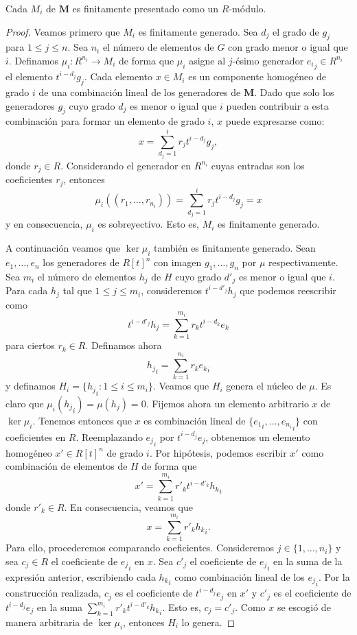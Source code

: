 \begin{lema}
	\label{lem:finit-pres} Cada $M_{i}$ de $\mathbf{M}$ es finitamente presentado como
	un $R$-módulo.
\end{lema}
\begin{proof}
	Veamos primero que $M_{i}$ es finitamente generado. Sea $d_{j}$ el grado de
	$g_{j}$ para $1 \leq j \leq n$. Sea $n_{i}$ el número de elementos de $G$ con grado
	menor o igual que $i$. Definamos $\mu_{i} : R^{n_i}\to M_{i}$ de forma que
	$\mu_{i}$ asigne al $j$-ésimo generador ${e_i}_{j} \in R^{n_i}$ el elemento
	$t^{i-d_j}g_{j}$. Cada elemento $x \in M_{i}$ es un componente homogéneo de grado
	$i$ de una combinación lineal de los generadores de $\mathbf{M}$. Dado que
	solo los generadores $g_{j}$ cuyo grado $d_{j}$ es menor o igual que $i$
	pueden contribuir a esta combinación para formar un elemento de grado $i$, $x$
	puede expresarse como:
	\[
	x = \sum_{d_j = 1}^{i} r_{j} t^{i-d_j}g_{j},
	\]
	donde $r_{j} \in R$. Considerando el generador en $R^{n_i}$ cuyas entradas son
	los coeficientes $r_{j}$, entonces
	\[
	\mu_{i}((r_{1}, \ldots, r_{n_i})) = \sum_{d_j = 1}^{i} r_{j} t^{i-d_j}g_{j} =
	x
	\]
	y en consecuencia, $\mu_{i}$ es sobreyectivo. Esto es, $M_{i}$ es finitamente generado.
	
	A continuación veamos que $\ker \mu_{i}$ también es finitamente generado. Sean
	$e_{1}, \ldots, e_{n}$ los generadores de $R[t]^{n}$ con imagen
	$g_{1}, \ldots, g_{n}$ por $\mu$ respectivamente. Sea $m_{i}$ el número de elementos
	$h_{j}$ de $H$ cuyo grado $d'_{j}$ es menor o igual que $i$. Para cada $h_{j}$
	tal que $1 \leq j \leq m_{i}$, consideremos $t^{i-d'_j}h_{j}$ que podemos reescribir
	como
	\[
	t^{i-d'_j}h_{j} = \sum_{k=1}^{m_i}r_{k} t^{i-d_k}e_{k}
	\]
	para ciertos $r_{k} \in R$. Definamos ahora
	\[
	{h_j}_{i} = \sum_{k=1}^{n_i}r_{k}{e_k}_{i}
	\]
	y definamos $H_{i} = \{{h_j}_{i} : 1 \leq i \leq m_{i} \}$. Veamos que $H_{i}$
	genera el núcleo de $\mu$. Es claro que $\mu_{i}({h_j}_{i}) = \mu(h_{j}) = 0$.
	Fijemos ahora un elemento arbitrario $x$ de $\ker \mu_{i}$. Tenemos entonces
	que $x$ es combinación lineal de $\{{e_1}_{i}, \ldots,{e_{n_i}}_{i}\}$ con
	coeficientes en $R$. Reemplazando ${e_j}_{i}$ por $t^{i-d_j}e_{j}$, obtenemos
	un elemento homogéneo $x' \in R[t]^{n}$ de grado $i$. Por hipótesis, podemos
	escribir $x'$ como combinación de elementos de $H$ de forma que
	\[
	x' = \sum_{k=1}^{m_i}r'_{k} t^{i-d'_k}{h_k}_{i}
	\]
	donde $r'_{k} \in R$. En consecuencia, veamos que
	\[
	x = \sum_{k=1}^{m_i}r'_{k}{h_k}_{i}.
	\]
	Para ello, procederemos comparando coeficientes. Consideremos
	$j \in \{1, \ldots, n_{i}\}$ y sea $c_{j} \in R$ el coeficiente de ${e_j}_{i}$
	en $x$. Sea $c'_{j}$ el coeficiente de ${e_j}_{i}$ en la suma de la expresión anterior,
	escribiendo cada ${h_k}_{i}$ como combinación lineal de los ${e_j}_{i}$. Por la
	construcción realizada, $c_{j}$ es el coeficiente de $t^{i-d_j}e_{j}$ en $x'$
	y $c'_{j}$ es el coeficiente de $t^{i-d_j}e_{j}$ en la suma
	$\sum_{k=1}^{m_i}r'_{k} t^{i-d'_k}{h_k}_{i}$. Esto es, $c_{j} = c'_{j}$. Como $x$
	se escogió de manera arbitraria de $\ker \mu_{i}$, entonces $H_{i}$ lo genera.
\end{proof}


